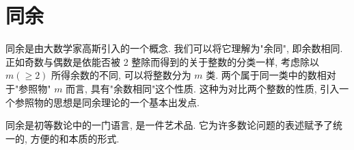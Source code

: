 \begin{comment}
	由于 $x=5^{m}>1$ , 可知上式右边两个式子中的数都大于 1 , 因此,  $A$ 为合数. \\
	当 $n$ 为奇数时, 设 $n=2 m+1, y=5^{m}, z=5 y^{2}$ , 则\begin{align}
		A & =1+z+z^{2}+z^{3}+z^{4}                                                                                              \\
		  & =\left(1+3 z+z^{2}\right)^{2}-5 z^{3}-10 z^{2}-5 z                                                                  \\
		  & =\left(1+3 z+z^{2}\right)^{2}-5 z(z+1)^{2}                                                                          \\
		  & =\left(1+5 y^{2}+25 y^{4}\right)^{2}-25 y^{2}\left(1+5 y^{2}\right)^{2}                                             \\
		  & =\left(1+5 y^{2}+25 y^{4}-5 y\left(1+5 y^{2}\right)\right)\left(1+5 y^{2}+25 y^{4}+5 y\left(1+5 y^{2}\right)\right)
	\end{align}

	当 $m>0$, 即 $y \geqslant 5$ 时, 上式右边两式都大于 1 ,此时, $A$ 为合数,当 $m=0$ 时, $A=1+5+5^{2}+5^{3}+5^{4}=781=11 \times 71$ 也是合数.

	所以, 对任意正整数 $n, A$ 为合数, 命题获证.

\newpage

\end{comment}

\newpage

\section{同余}
同余是由大数学家高斯引入的一个概念. 我们可以将它理解为"余同", 即余数相同. 正如奇数与偶数是依能否被 2 整除而得到的关于整数的分类一样, 考虑除以 $m(\geqslant 2)$ 所得余数的不同, 可以将整数分为 $m$ 类. 两个属于同一类中的数相对于"参照物" $m$ 而言, 具有"余数相同"这个性质. 这种为对比两个整数的性质, 引入一个参照物的思想是同余理论的一个基本出发点.

同余是初等数论中的一门语言, 是一件艺术品. 它为许多数论问题的表述赋予了统一的, 方便的和本质的形式.
